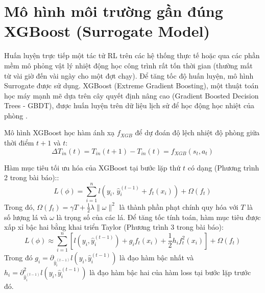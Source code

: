 \documentclass[12pt, a4paper]{report}
\begin{document}
\section{Mô hình môi trường gần đúng XGBoost (Surrogate Model)}
Huấn luyện trực tiếp một tác tử RL trên các hệ thống thực tế hoặc qua các phần mềm mô phỏng vật lý nhiệt động học công trình rất tốn thời gian (thường mất từ vài giờ đến vài ngày cho một đợt chạy). Để tăng tốc độ huấn luyện, mô hình Surrogate được sử dụng. XGBoost (Extreme Gradient Boosting), một thuật toán học máy mạnh mẽ dựa trên cây quyết định nâng cao (Gradient Boosted Decision Trees - GBDT), được huấn luyện trên dữ liệu lịch sử để học động học nhiệt của phòng \cite{xgboost,whulx}.

Mô hình XGBoost học hàm ánh xạ $f_{XGB}$ để dự đoán độ lệch nhiệt độ phòng giữa thời điểm $t+1$ và $t$:
\begin{equation}
\Delta T_{in}(t) = T_{in}(t+1) - T_{in}(t) = f_{XGB}(s_t, a_t)
\end{equation}

Hàm mục tiêu tối ưu hóa của XGBoost tại bước lặp thứ $t$ có dạng (Phương trình 2 trong bài báo):\cite{xgboost}:
\begin{equation}
L(\phi) = \sum_{i=1}^{n} l\left(y_i,\, \hat{y}_i^{(t-1)} + f_t(x_i)\right) + \Omega(f_t)
\end{equation}
Trong đó, $\Omega(f_t) = \gamma T + \frac{1}{2}\lambda \|\omega\|^2$ là thành phần phạt chính quy hóa với $T$ là số lượng lá và $\omega$ là trọng số của các lá. Để tăng tốc tính toán, hàm mục tiêu được xấp xỉ bậc hai bằng khai triển Taylor (Phương trình 3 trong bài báo):
\begin{equation}
L(\phi) \approx \sum_{i=1}^{n} \left[ l\!\left(y_i, \hat{y}_i^{(t-1)}\right) + g_i f_t(x_i) + \frac{1}{2} h_i f_t^2(x_i) \right] + \Omega(f_t)
\end{equation}
Trong đó $g_i = \partial_{\hat{y}_i^{(t-1)}} l(y_i, \hat{y}_i^{(t-1)})$ là đạo hàm bậc nhất và $h_i = \partial^2_{\hat{y}_i^{(t-1)}} l(y_i, \hat{y}_i^{(t-1)})$ là đạo hàm bậc hai của hàm loss tại bước lặp trước đó.
\end{document}
